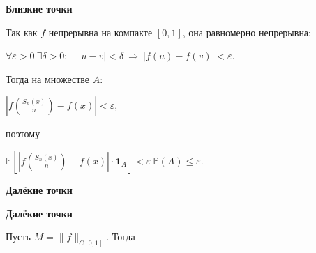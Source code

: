 \documentclass[11pt]{article}
\begin{document}
\begin{center}
{\color{notaeYELLOW}\bfseries\fontsize{44}{52}\selectfont Близкие точки}
\end{center}
\vspace*{\fill}
\begin{center}
\fontsize{36}{43}\selectfont
Так как $f$ непрерывна на компакте $[0,1]$, она равномерно непрерывна:\par\vspace{0.4in}
$\forall \varepsilon>0\ \exists \delta>0: \quad |u-v|<\delta\ \Rightarrow\ |f(u)-f(v)|<\varepsilon.$\par\vspace{0.4in}
Тогда на множестве $A$:\par\vspace{0.4in}
$\left| f\!\left(\frac{S_n(x)}{n}\right) - f(x) \right| < \varepsilon,$\par\vspace{0.4in}
поэтому\par\vspace{0.4in}
$\mathbb{E}\left[ \left| f\!\left(\frac{S_n(x)}{n}\right) - f(x) \right| \cdot \mathbf{1}_A \right] < \varepsilon \, \mathbb{P}(A) \leqslant \varepsilon.$\par\vspace{0.4in}
\end{center}
\vspace*{\fill}

\newpage

\begin{center}
{\color{notaeYELLOW}\bfseries\fontsize{44}{52}\selectfont Далёкие точки}
\end{center}
\vspace*{\fill}
\begin{center}
\fontsize{36}{43}\selectfont
\end{center}
\vspace*{\fill}

\newpage

\begin{center}
{\color{notaeYELLOW}\bfseries\fontsize{44}{52}\selectfont Далёкие точки}
\end{center}
\vspace*{\fill}
\begin{center}
\fontsize{36}{43}\selectfont
Пусть $M = \|f\|_{C[0,1]}$. Тогда\par\vspace{0.4in}
\end{center}
\vspace*{\fill}
\end{document}

